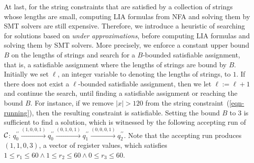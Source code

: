 At last, for the string constraints that are satisfied by a collection of strings whose lengths are small, computing LIA formulas from NFA and solving them by SMT solvers are still expensive.  
Therefore, we introduce a heuristic of searching for solutions based on \emph{under approximations}, before computing LIA formulas and solving them by SMT solvers. More precisely, we enforce a constant upper bound $B$ on the lengths of strings and search for a $B$-bounded satisfiable assignment, that is, a satisfiable assignment where the lengths of strings are bound by $B$. Initially we set $\ell$, an integer variable to denoting the lengths of strings, to $1$. If there does not exist a $\ell$-bounded satisfiable assignment, then we let $\ell:=\ell+1$ and continue the search, until finding a satisfiable assignment or reaching the bound $B$. For instance, if we remove $|x| > 120$ from the string constraint~(\ref{eqn-running}), then the resulting constraint is satisfiable. Setting the bound $B$ to $3$ is sufficient to find a solution, which is witnessed by the following accepting run of $\mathcal{C}$: $q^{\prime\prime}_0 \xrightarrow{(1,0,0,1)} q^{\prime\prime}_0 \xrightarrow{(0,1,0,1)} q^{\prime\prime}_1 \xrightarrow{(0,0,0,1)} q^{\prime\prime}_2$. Note that the accepting run produces $(1,1,0,3)$, a vector of register values,  which satisfies $1 \le r_1 \le 60 \wedge 1 \le r_2 \le 60 \wedge 0 \le r_3 \le 60$.





